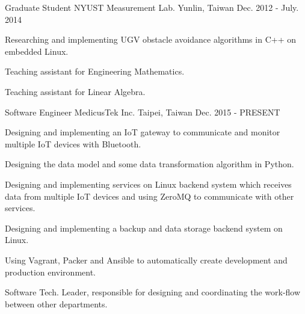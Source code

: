 

\begin{cventries}

  \cventry
    {Graduate Student} %
    {NYUST Measurement Lab.} %
    {Yunlin, Taiwan} %
    {Dec. 2012 - July. 2014} %
    {
      \begin{cvitems} %
        \item {Researching and implementing UGV obstacle avoidance algorithms in C++ on embedded Linux.}
        \item {Teaching assistant for Engineering Mathematics.}
        \item {Teaching assistant for Linear Algebra.}
      \end{cvitems}
    }

  \cventry
    {Software Engineer} %
    {MedicusTek Inc.} %
    {Taipei, Taiwan} %
    {Dec. 2015 - PRESENT} %
    {
      \begin{cvitems} %
        \item {Designing and implementing an IoT gateway to communicate and monitor multiple IoT devices with Bluetooth.}
        \item {Designing the data model and some data transformation algorithm in Python.}
        \item {Designing and implementing services on Linux backend system which receives data from multiple IoT devices and using ZeroMQ to communicate with other services.}
        \item {Designing and implementing a backup and data storage backend system on Linux.}
        \item {Using Vagrant, Packer and Ansible to automatically create development and production environment.}
        \item {Software Tech. Leader, responsible for designing and coordinating the work-flow between other departments.}
      \end{cvitems}
    }

\end{cventries}
